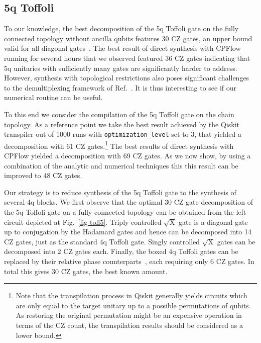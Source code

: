 \documentclass[twocolumn, amsfonts, amssymb, aps, nofootinbib]{revtex4-2}
\newcommand{\CZ}{\textsf{CZ }}
\newcommand{\package}[1]{\textrm {#1 }}
\newcommand{\cpflow}{\package{CPFlow}}
\newcommand{\param}[1]{\texttt{#1}}
\begin{document}
\subsection{5q Toffoli \label{sec toff5}}

To our knowledge, the best decomposition of the 5q Toffoli gate on the fully connected topology without ancilla qubits features $30$ \CZ gates, an upper bound valid for all diagonal gates~\cite{Shende2006}. The best result of direct synthesis with \cpflow running for several hours that we observed featured 36 \CZ gates indicating that 5q unitaries with sufficiently many gates are significantly harder to address. However, synthesis with topological restrictions also poses significant challenges to the demultiplexing framework of Ref.~\cite{Shende2006}. It is thus interesting to see if our numerical routine can be useful.

To this end we consider the compilation of the 5q Toffoli gate on the chain topology. As a reference point we take the best result achieved by the \package{Qiskit} transpiler out of 1000 runs with \param{optimization\_level} set to 3, that yielded a decomposition with 61 \CZ gates.\footnote{Note that the transpilation process in \package{Qiskit} generally yields circuits which are only equal to the target unitary up to a possible permutations of qubits. As restoring the original permutation might be an expensive operation in terms of the \CZ count, the transpilation results should be considered as a lower bound.} The best results of direct synthesis with \cpflow yielded a decomposition with 69 \CZ gates. As we now show, by using a combination of the analytic and numerical techniques this this result can be improved to 48 \CZ gates.

Our strategy is to reduce synthesis of the 5q Toffoli gate to the synthesis of several 4q blocks. We first observe that the optimal 30 \CZ gate decomposition of the 5q Toffoli gate on a fully connected topology can be obtained from the left circuit depicted at Fig.~\ref{fig toff5}. Triply controlled $\sqrt{\text{X}}$ gate is a diagonal gate up to conjugation by the Hadamard gates and hence can be decomposed into 14 \CZ gates, just as the standard 4q Toffoli gate. Singly controlled $\sqrt{\text{X}}$ gates can be decomposed into 2 \CZ gates each. Finally, the boxed 4q Toffoli gates can be replaced by their relative phase counterparts~\cite{Maslov}, each requiring only 6 \CZ gates. In total this gives 30 \CZ gates, the best known amount.
\end{document}
